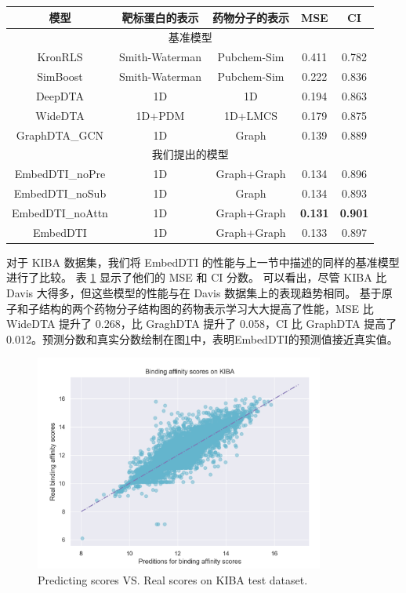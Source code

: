 \begin{table}[!htbp]
\centering
{}
\begin{tabular}{c|c|c|c|c}
\toprule
模型 & 靶标蛋白的表示 & 药物分子的表示 & MSE & CI \\ 
\midrule
\multicolumn{5}{c}{基准模型} \\
\midrule
KronRLS & Smith-Waterman & Pubchem-Sim & 0.411 & 0.782\\ 
SimBoost & Smith-Waterman & Pubchem-Sim & 0.222 & 0.836 \\
DeepDTA & 1D & 1D & 0.194 & 0.863 \\
WideDTA & 1D+PDM & 1D+LMCS & 0.179 & 0.875\\
GraphDTA\_GCN & 1D & Graph & 0.139 & 0.889 \\
\midrule
\multicolumn{5}{c}{我们提出的模型} \\
\midrule
EmbedDTI\_noPre & 1D & Graph+Graph & 0.134 & 0.896 \\ 
EmbedDTI\_noSub & 1D & Graph & 0.134 & 0.893 \\
EmbedDTI\_noAttn & 1D & Graph+Graph & \textbf{0.131} & \textbf{0.901} \\
EmbedDTI & 1D & Graph+Graph & 0.133 & 0.897 \\ 
\bottomrule
\end{tabular}
\label{table:kiba}
\end{table}

对于 KIBA 数据集，我们将 EmbedDTI 的性能与上一节中描述的同样的基准模型进行了比较。 表 \ref{table:kiba} 显示了他们的 MSE 和 CI 分数。 可以看出，尽管 KIBA 比 Davis 大得多，但这些模型的性能与在 Davis 数据集上的表现趋势相同。 基于原子和子结构的两个药物分子结构图的药物表示学习大大提高了性能，MSE 比 WideDTA 提升了 0.268，比 GraghDTA 提升了 0.058，CI 比 GraphDTA 提高了 0.012。预测分数和真实分数绘制在图\ref{fig:kiba-affinity}中，表明EmbedDTI的预测值接近真实值。

\begin{figure}[!htbp] 
\centering
\includegraphics[width=0.85\textwidth]  {imgs/kiba-affinity.png}
{Predicting scores VS. Real scores on KIBA test dataset.}
\label{fig:kiba-affinity}
\end{figure}


